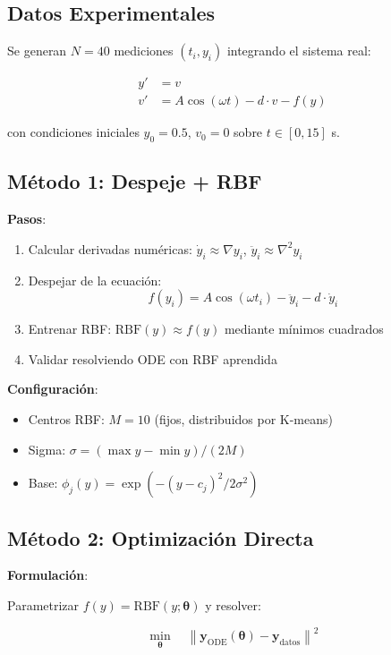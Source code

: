 \documentclass[11pt,a4paper]{article}
\begin{document}
\subsection{Datos Experimentales}

Se generan $N = 40$ mediciones $(t_i, y_i)$ integrando el sistema real:

\begin{align}
y' &= v \\
v' &= A \cos(\omega t) - d \cdot v - f(y)
\end{align}

con condiciones iniciales $y_0 = 0.5$, $v_0 = 0$ sobre $t \in [0, 15]$ s.

\subsection{Método 1: Despeje + RBF}

\textbf{Pasos}:
\begin{enumerate}
\item Calcular derivadas numéricas: $\dot{y}_i \approx \nabla y_i$, $\ddot{y}_i \approx \nabla^2 y_i$
\item Despejar de la ecuación:
\begin{equation}
f(y_i) = A \cos(\omega t_i) - \ddot{y}_i - d \cdot \dot{y}_i
\end{equation}
\item Entrenar RBF: $\text{RBF}(y) \approx f(y)$ mediante mínimos cuadrados
\item Validar resolviendo ODE con RBF aprendida
\end{enumerate}

\textbf{Configuración}:
\begin{itemize}
\item Centros RBF: $M = 10$ (fijos, distribuidos por K-means)
\item Sigma: $\sigma = (\max y - \min y) / (2M)$
\item Base: $\phi_j(y) = \exp(-(y - c_j)^2 / 2\sigma^2)$
\end{itemize}

\subsection{Método 2: Optimización Directa}

\textbf{Formulación}:

Parametrizar $f(y) = \text{RBF}(y; \boldsymbol{\theta})$ y resolver:

\begin{equation}
\min_{\boldsymbol{\theta}} \quad \left\| \mathbf{y}_{\text{ODE}}(\boldsymbol{\theta}) - \mathbf{y}_{\text{datos}} \right\|^2
\end{equation}
\end{document}

